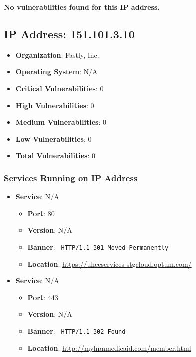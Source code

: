 \documentclass{article}
\begin{document}
\textbf{No vulnerabilities found for this IP address.}




\clearpage



\subsection*{IP Address: 151.101.3.10}

\begin{itemize}
    \item \textbf{Organization}: Fastly, Inc.
    \item \textbf{Operating System}:  N/A 
    \item \textbf{Critical Vulnerabilities}: 0
    \item \textbf{High Vulnerabilities}: 0
    \item \textbf{Medium Vulnerabilities}: 0
    \item \textbf{Low Vulnerabilities}: 0
    \item \textbf{Total Vulnerabilities}: 0
\end{itemize}

\subsubsection*{Services Running on IP Address}

\begin{itemize}
    
        \item \textbf{Service}: N/A
        \begin{itemize}
            \item \textbf{Port}: 80
            \item \textbf{Version}:  N/A 
            \item \textbf{Banner}: \texttt{
                HTTP/1.1 301 Moved Permanently
            }
            \item \textbf{Location}: \href{ https://uhceservices-stgcloud.optum.com/ }{ https://uhceservices-stgcloud.optum.com/ }
        \end{itemize}
    
        \item \textbf{Service}: N/A
        \begin{itemize}
            \item \textbf{Port}: 443
            \item \textbf{Version}:  N/A 
            \item \textbf{Banner}: \texttt{
                HTTP/1.1 302 Found
            }
            \item \textbf{Location}: \href{ http://myhpnmedicaid.com/member.html }{ http://myhpnmedicaid.com/member.html }
        \end{itemize}
    
\end{itemize}
\end{document}
